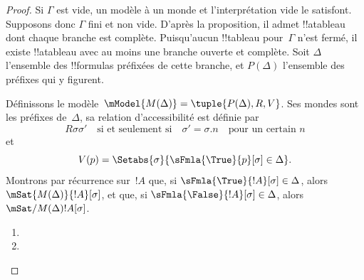 \documentclass[../../../include/open-logic-section]{subfiles}
\begin{document}
\begin{proof}
Si $\Gamma$ est vide, un modèle à un monde et l’interprétation vide le satisfont. Supposons donc $\Gamma$ fini et non vide. D'après la proposition, il admet
!!a{tableau} dont chaque branche est complète. Puisqu'aucun
!!{tableau} pour~$\Gamma$ n'est fermé, il existe !!a{tableau} avec
au moins une branche ouverte et complète. Soit $\Delta$ l'ensemble
des !!{formula}s préfixées de cette branche, et $P(\Delta)$ l'ensemble
des préfixes qui y figurent.

Définissons le modèle~$\mModel{M(\Delta)} = \tuple{P(\Delta), R, V}$.
Ses mondes sont les préfixes de~$\Delta$, sa relation d'accessibilité
est définie par
\[
R\sigma\sigma' \quad \text{si et seulement si} \quad
\sigma'=\sigma.n \quad \text{pour un certain } n
\]
et
\[
V(p) = \Setabs{\sigma}{\sFmla{\True}{p}[\sigma] \in \Delta}.
\]
Montrons par récurrence sur~$!A$ que, si $\sFmla{\True}{!A}[\sigma] \in
\Delta$, alors $\mSat{M(\Delta)}{!A}[\sigma]$, et que, si
$\sFmla{\False}{!A}[\sigma] \in \Delta$, alors
$\mSat/{M(\Delta)}{!A}[\sigma]$.

\begin{enumerate}   
  \item {}
  \item {}
\end{enumerate}
\end{proof}
\end{document}
